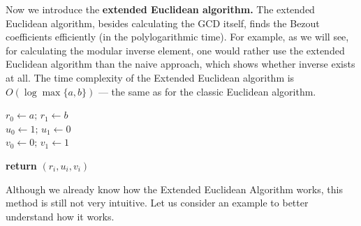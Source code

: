 \documentclass[../../book.tex]{subfiles}
\begin{document}
Now we introduce the \textbf{extended Euclidean algorithm.} The extended
Euclidean algorithm, besides calculating the GCD itself, finds the Bezout
coefficients efficiently (in the polylogarithmic time). For example, as we will
see, for calculating the modular inverse element, one would rather use the
extended Euclidean algorithm than the naive approach, which shows whether
inverse exists at all. The time complexity of the Extended Euclidean algorithm
is $O(\log\max\{a,b\})$ --- the same as for the classic Euclidean
algorithm.

\begin{algorithm}[H]
    \caption{Extended Euclidean algorithm} \label{alg:extended_euclidean}
        
    $r_{0} \gets a; \, r_{1} \gets b$ \\
    $u_{0} \gets 1; \, u_{1} \gets 0$ \\
    $v_{0} \gets 0; \, v_{1} \gets 1$ \\


    \textbf{return} $(r_i, u_i, v_i)$
\end{algorithm}

Although we already know how the Extended Euclidean Algorithm
works, this method is still not very intuitive. Let us consider an example to
better understand how it works.
\end{document}
